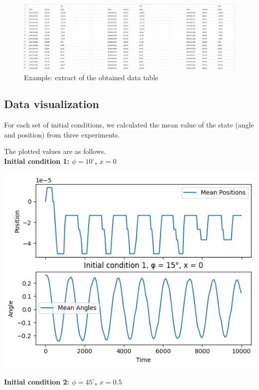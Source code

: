 \documentclass{article}
\begin{document}
\begin{figure}[h]
  \centering
  \includegraphics[scale=0.21]{data/measurements.png}
  \caption{Example: extract of the obtained data table}
\end{figure}

\subsection{Data visualization}
For each set of initial conditions, we calculated the mean value of the state (angle and position) from three experiments. 

The plotted values are as follows.\\

\textbf{Initial condition 1: $\phi = 10^\circ$, $x = 0$}

\includegraphics*[scale=0.5]{graphics/init_1.png}

\textbf{Initial condition 2: $\phi = 45^\circ$, $x = 0.5$}
\end{document}
